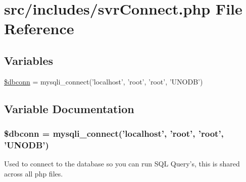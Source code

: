 \hypertarget{svrConnect_8php}{\section{src/includes/svr\-Connect.php \-File \-Reference}
\label{svrConnect_8php}
}
\subsection*{\-Variables}
\begin{DoxyCompactItemize}
\item 
\hyperlink{svrConnect_8php_aefbfdbdc7b698d2c2220f869fc668040}{\$dbconn} = mysqli\-\_\-connect('localhost', 'root', 'root', '\-U\-N\-O\-D\-B')
\end{DoxyCompactItemize}


\subsection{\-Variable \-Documentation}
\hypertarget{svrConnect_8php_aefbfdbdc7b698d2c2220f869fc668040}{
\subsubsection[{\$dbconn}]{\setlength{\rightskip}{0pt plus 5cm}\$dbconn = mysqli\-\_\-connect('localhost', 'root', 'root', '\-U\-N\-O\-D\-B')}}\label{svrConnect_8php_aefbfdbdc7b698d2c2220f869fc668040}
\-Used to connect to the database so you can run \-S\-Q\-L \-Query's, this is shared across all php files. 